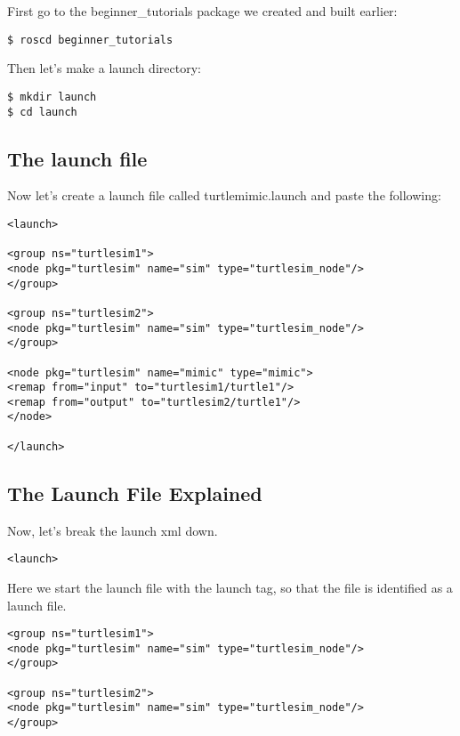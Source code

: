 First go to the beginner\_tutorials package we created and built earlier:

\begin{lstlisting}[breaklines=true languages=bash]
$ roscd beginner_tutorials
\end{lstlisting}

Then let's make a launch directory:

\begin{lstlisting}[breaklines=true languages=bash]
$ mkdir launch
$ cd launch
\end{lstlisting}

\subsection{The launch file}

Now let's create a launch file called turtlemimic.launch and paste the following:

\begin{lstlisting}[breaklines=true languages=bash]
<launch>

<group ns="turtlesim1">
<node pkg="turtlesim" name="sim" type="turtlesim_node"/>
</group>

<group ns="turtlesim2">
<node pkg="turtlesim" name="sim" type="turtlesim_node"/>
</group>

<node pkg="turtlesim" name="mimic" type="mimic">
<remap from="input" to="turtlesim1/turtle1"/>
<remap from="output" to="turtlesim2/turtle1"/>
</node>

</launch>
\end{lstlisting}

\subsection{The Launch File Explained}

Now, let's break the launch xml down.

\begin{lstlisting}[breaklines=true languages=xml]
<launch>
\end{lstlisting}

Here we start the launch file with the launch tag, so that the file is identified as a launch file.

\begin{lstlisting}[breaklines=true languages=xml]
  <group ns="turtlesim1">
<node pkg="turtlesim" name="sim" type="turtlesim_node"/>
</group>

<group ns="turtlesim2">
<node pkg="turtlesim" name="sim" type="turtlesim_node"/>
</group>
\end{lstlisting}

